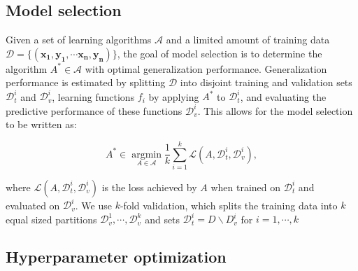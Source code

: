\documentclass{article}
\begin{document}
\subsection{Model selection}

Given a set of learning algorithms $\mathcal{A}$ and a limited amount of training data $\mathcal{D} = \{ (\mathbf{x_1}, \mathbf{y_1}, \cdots \mathbf{x_n}, \mathbf{y_n}) \}$, the goal of model selection is to determine the algorithm $A^* \in \mathcal{A}$ with optimal generalization performance. Generalization performance is estimated by splitting $\mathcal{D}$ into disjoint training and validation sets $\mathcal{D}^{i}_{t}$ and $\mathcal{D}^{i}_{v}$, learning functions $f_i$ by applying $A^*$ to $\mathcal{D}^{i}_{t}$, and evaluating the predictive performance of these functions $\mathcal{D}^{i}_{v}$. This allows for the model selection to be written as:

\begin{equation}
A^* \in \underset{A \in \mathcal{A}}{\operatorname{argmin}} \frac{1}{k} \sum_{i=1}^{k} \mathcal{L} \left( A, \mathcal{D}^{i}_{t},  \mathcal{D}^{i}_{v} \right),
\end{equation}

where $ \mathcal{L} \left( A, \mathcal{D}^{i}_{t},  \mathcal{D}^{i}_{v} \right) $ is the loss achieved by $A$ when trained on $\mathcal{D}^{i}_{t}$ and evaluated on $\mathcal{D}^{i}_{v}$. We use $k$-fold validation, which splits the training data into $k$ equal sized partitions $ \mathcal{D}^{1}_{v}, \cdots,  \mathcal{D}^{k}_{v}$ and sets $ \mathcal{D}^{i}_{t} =  D \backslash D^{i}_{v}$ for $i = 1, \cdots, k$

\subsection{Hyperparameter optimization}
\end{document}
